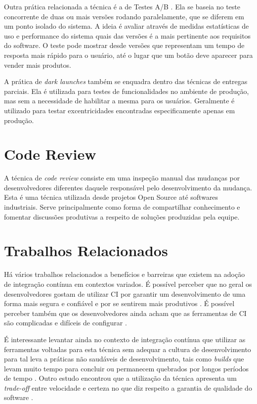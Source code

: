 Outra prática relacionada a técnica é a de Testes A/B \cite{testsAB}. Ela se baseia no teste concorrente de duas ou mais versões rodando paralelamente, que se diferem em um ponto isolado do sistema. A ideia é avaliar através de medidas estatísticas de uso e performance do sistema quais das versões é a mais pertinente aos requisitos do software. O teste pode mostrar desde versões que representam um tempo de resposta mais rápido para o usuário, até o lugar que um botão deve aparecer para vender mais produtos.

A prática de \emph{dark launches} \cite{devAndDeploymentFB} também se enquadra dentro das técnicas de entregas parciais. Ela é utilizada para testes de funcionalidades no ambiente de produção, mas sem a necessidade de habilitar a mesma para os usuários. Geralmente é utilizado para testar excentricidades encontradas especificamente apenas em produção.  


\section{Code Review}

A técnica de \emph{code review} \cite{codeReview} consiste em uma inspeção manual das mudanças por desenvolvedores diferentes daquele responsável pelo desenvolvimento da mudança. Esta é uma técnica utilizada desde projetos Open Source até softwares industriais. Serve principalmente como forma de compartilhar conhecimento e fomentar discussões produtivas a respeito de soluções produzidas pela equipe.

\section{Trabalhos Relacionados}

Há vários trabalhos relacionados a benefícios e barreiras que existem na adoção de integração contínua em contextos variados. É possível perceber que no geral os desenvolvedores gostam de utilizar CI por garantir um desenvolvimento de uma forma mais segura e confiável \cite{googleCi} e por se sentirem mais produtivos \cite{hilton2016}. É possível perceber também que os desenvolvedores ainda acham que as ferramentas de CI são complicadas e difíceis de configurar \cite{hilton2016}. 

É interessante levantar ainda no contexto de integração contínua que utilizar as ferramentas voltadas para esta técnica sem adequar a cultura de desenvolvimento para tal leva a práticas não saudáveis de desenvolvimento, tais como \emph{builds} que levam muito tempo para concluir ou permanecem quebrados por longos períodos de tempo  \cite{citheater2019}. Outro estudo encontrou que a utilização da técnica apresenta um \emph{trade-off} entre velocidade e certeza no que diz respeito a garantia de qualidade do software \cite{hilton2016}.

